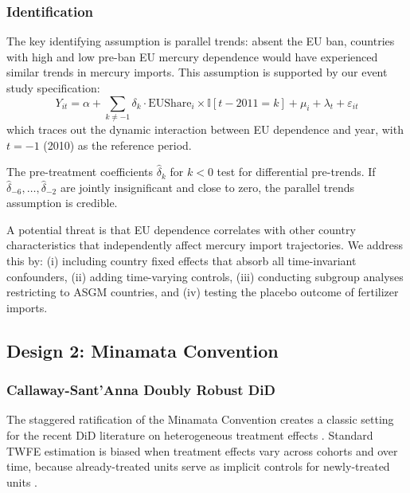 \documentclass[12pt]{article}
\newcommand{\ind}{\mathbb{I}}
\begin{document}
\subsubsection{Identification}

The key identifying assumption is parallel trends: absent the EU ban, countries with high and low pre-ban EU mercury dependence would have experienced similar trends in mercury imports. This assumption is supported by our event study specification:
\begin{equation}
\label{eq:eu_event}
Y_{it} = \alpha + \sum_{k \neq -1} \delta_k \cdot \text{EUShare}_i \times \ind[t - 2011 = k] + \mu_i + \lambda_t + \varepsilon_{it}
\end{equation}
which traces out the dynamic interaction between EU dependence and year, with $t = -1$ (2010) as the reference period.

The pre-treatment coefficients $\hat{\delta}_k$ for $k < 0$ test for differential pre-trends. If $\hat{\delta}_{-6}, \ldots, \hat{\delta}_{-2}$ are jointly insignificant and close to zero, the parallel trends assumption is credible.

A potential threat is that EU dependence correlates with other country characteristics that independently affect mercury import trajectories. We address this by: (i) including country fixed effects that absorb all time-invariant confounders, (ii) adding time-varying controls, (iii) conducting subgroup analyses restricting to ASGM countries, and (iv) testing the placebo outcome of fertilizer imports.

\subsection{Design 2: Minamata Convention}

\subsubsection{Callaway-Sant'Anna Doubly Robust DiD}

The staggered ratification of the Minamata Convention creates a classic setting for the recent DiD literature on heterogeneous treatment effects \citep{goodmanbacon2021difference, sun2021estimating, roth2023whats}. Standard TWFE estimation is biased when treatment effects vary across cohorts and over time, because already-treated units serve as implicit controls for newly-treated units \citep{dechaisemartin2020two, borusyak2024revisiting}.
\end{document}
